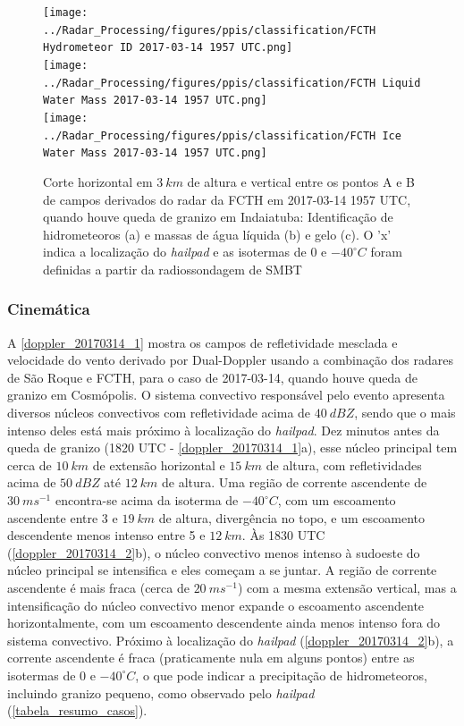 \begin{figure}[htb]
	\centering
	\caption{Corte horizontal em $3\:km$ de altura e vertical entre os pontos A e B de campos derivados do radar da FCTH em 2017-03-14 1957 UTC, quando houve queda de granizo em Indaiatuba: Identificação de hidrometeoros (a) e massas de água líquida (b) e gelo (c). O 'x' indica a localização do \textit{hailpad} e as isotermas de $0$ e $-40^{\circ}C$ foram definidas a partir da radiossondagem de SMBT} 
	\label{radar_derived_20170314_2}
	\vspace{-5pt}
	\texttt{[image: ../Radar\_Processing/figures/ppis/classification/FCTH Hydrometeor ID 2017-03-14 1957 UTC.png]} \\
	\vspace{-5pt}
	\texttt{[image: ../Radar\_Processing/figures/ppis/classification/FCTH Liquid Water Mass 2017-03-14 1957 UTC.png]} \\
	\vspace{-5pt}
	\texttt{[image: ../Radar\_Processing/figures/ppis/classification/FCTH Ice Water Mass 2017-03-14 1957 UTC.png]} \\
\end{figure}

\pagebreak

\subsubsection{Cinemática}\label{cinematica_201703014}

A \autoref{doppler_20170314_1} mostra os campos de refletividade mesclada e velocidade do vento derivado por Dual-Doppler usando a combinação dos radares de São Roque e FCTH, para o caso de 2017-03-14, quando houve queda de granizo em Cosmópolis. O sistema convectivo responsável pelo evento apresenta diversos núcleos convectivos com refletividade acima de $40\:dBZ$, sendo que o mais intenso deles está mais próximo à localização do \textit{hailpad}. Dez minutos antes da queda de granizo (1820 UTC - \autoref{doppler_20170314_1}a), esse núcleo principal tem cerca de $10\:km$ de extensão horizontal e $15\:km$ de altura, com refletividades acima de $50\:dBZ$ até $12\:km$ de altura. Uma região de corrente ascendente de $30\:ms^{-1}$ encontra-se acima da isoterma de $-40^{\circ}C$, com um escoamento ascendente entre 3 e $19\:km$ de altura, divergência no topo, e um escoamento descendente menos intenso entre 5 e $12\:km$. Às 1830 UTC (\autoref{doppler_20170314_2}b), o núcleo convectivo menos intenso à sudoeste do núcleo principal se intensifica e eles começam a se juntar. A região de corrente ascendente é mais fraca (cerca de $20\:ms^{-1}$) com a mesma extensão vertical, mas a intensificação do núcleo convectivo menor expande o escoamento ascendente horizontalmente, com um escoamento descendente ainda menos intenso fora do sistema convectivo. Próximo à localização do \textit{hailpad} (\autoref{doppler_20170314_2}b), a corrente ascendente é fraca (praticamente nula em alguns pontos) entre as isotermas de 0 e $-40^{\circ}C$, o que pode indicar a precipitação de hidrometeoros, incluindo granizo pequeno, como observado pelo \textit{hailpad} (\autoref{tabela_resumo_casos}).

